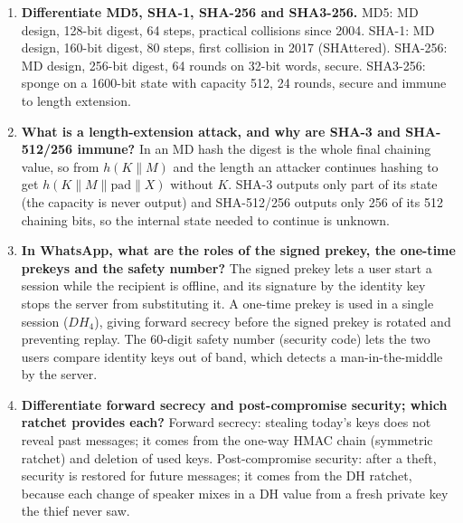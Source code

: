 \begin{enumerate}[leftmargin=1.6em,itemsep=3pt]
  \item \textbf{Differentiate MD5, SHA-1, SHA-256 and SHA3-256.} MD5: MD design, 128-bit digest, 64 steps, practical collisions since 2004. SHA-1: MD design, 160-bit digest, 80 steps, first collision in 2017 (SHAttered). SHA-256: MD design, 256-bit digest, 64 rounds on 32-bit words, secure. SHA3-256: sponge on a 1600-bit state with capacity 512, 24 rounds, secure and immune to length extension.
  \item \textbf{What is a length-extension attack, and why are SHA-3 and SHA-512/256 immune?} In an MD hash the digest is the whole final chaining value, so from $h(K \| M)$ and the length an attacker continues hashing to get $h(K \| M \| \text{pad} \| X)$ without $K$. SHA-3 outputs only part of its state (the capacity is never output) and SHA-512/256 outputs only 256 of its 512 chaining bits, so the internal state needed to continue is unknown.
  \item \textbf{In WhatsApp, what are the roles of the signed prekey, the one-time prekeys and the safety number?} The signed prekey lets a user start a session while the recipient is offline, and its signature by the identity key stops the server from substituting it. A one-time prekey is used in a single session ($DH_4$), giving forward secrecy before the signed prekey is rotated and preventing replay. The 60-digit safety number (security code) lets the two users compare identity keys out of band, which detects a man-in-the-middle by the server.
  \item \textbf{Differentiate forward secrecy and post-compromise security; which ratchet provides each?} Forward secrecy: stealing today's keys does not reveal past messages; it comes from the one-way HMAC chain (symmetric ratchet) and deletion of used keys. Post-compromise security: after a theft, security is restored for future messages; it comes from the DH ratchet, because each change of speaker mixes in a DH value from a fresh private key the thief never saw.
\end{enumerate}

